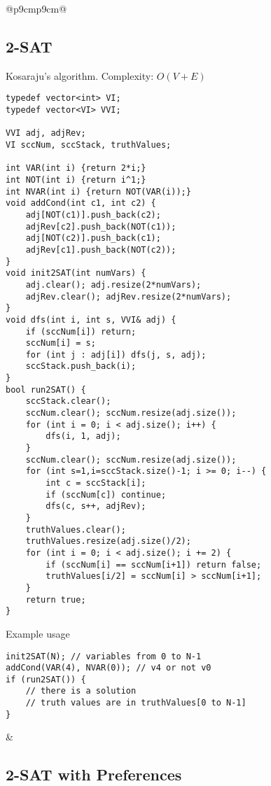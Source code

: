 \documentclass[letterpaper]{article}
\begin{document}
\vspace*{-2em}
\begin{tabular}{@{}p{9cm}p{9cm}@{}}
\subsection{2-SAT}

Kosaraju's algorithm. Complexity: $O\left(V + E\right)$

\begin{lstlisting}
typedef vector<int> VI;
typedef vector<VI> VVI;

VVI adj, adjRev;
VI sccNum, sccStack, truthValues;

int VAR(int i) {return 2*i;}
int NOT(int i) {return i^1;}
int NVAR(int i) {return NOT(VAR(i));}
void addCond(int c1, int c2) {
	adj[NOT(c1)].push_back(c2);
	adjRev[c2].push_back(NOT(c1));
	adj[NOT(c2)].push_back(c1);
	adjRev[c1].push_back(NOT(c2));
}
void init2SAT(int numVars) {
	adj.clear(); adj.resize(2*numVars);
	adjRev.clear(); adjRev.resize(2*numVars);
}
void dfs(int i, int s, VVI& adj) {
	if (sccNum[i]) return;
	sccNum[i] = s;
	for (int j : adj[i]) dfs(j, s, adj);
	sccStack.push_back(i);
}
bool run2SAT() {
	sccStack.clear();
	sccNum.clear(); sccNum.resize(adj.size());
	for (int i = 0; i < adj.size(); i++) {
		dfs(i, 1, adj);
	}
	sccNum.clear(); sccNum.resize(adj.size());
	for (int s=1,i=sccStack.size()-1; i >= 0; i--) {
		int c = sccStack[i];
		if (sccNum[c]) continue;
		dfs(c, s++, adjRev);
	}
	truthValues.clear();
	truthValues.resize(adj.size()/2);
	for (int i = 0; i < adj.size(); i += 2) {
		if (sccNum[i] == sccNum[i+1]) return false;
		truthValues[i/2] = sccNum[i] > sccNum[i+1];
	}
	return true;
}
\end{lstlisting}
Example usage
\begin{lstlisting}
init2SAT(N); // variables from 0 to N-1
addCond(VAR(4), NVAR(0)); // v4 or not v0
if (run2SAT()) {
	// there is a solution
	// truth values are in truthValues[0 to N-1]
}
\end{lstlisting}
&
\subsection{2-SAT with Preferences}


\end{tabular}
\end{document}
